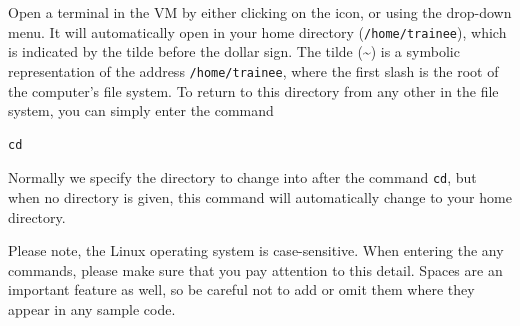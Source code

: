 \begin{steps}
Open a terminal in the VM by either clicking on the icon, or using the drop-down menu.
It will automatically open in your home directory (\texttt{/home/trainee}), which is indicated by the tilde before the dollar sign.
The tilde (\~{}) is a symbolic representation of the address \texttt{/home/trainee}, where the first slash is the root of the computer’s file system.
To return to this directory from any other in the file system, you can simply enter the command
\begin{lstlisting}
cd 
\end{lstlisting}
\end{steps}


Normally we specify the directory to change into after the command \texttt{cd}, but when no directory is given, this command will automatically change to your home directory.\\

\begin{warning}
Please note, the Linux operating system is case-sensitive.
When entering the any commands, please make sure that you pay attention to this detail.
Spaces are an important feature as well, so be careful not to add or omit them where they appear in any sample code.
\end{warning}




%
